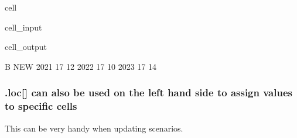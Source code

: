 \documentclass[letterpaper,10pt,english]{jupyterBook}
\begin{document}
\begin{sphinxuseclass}{cell}\begin{sphinxVerbatimInput}

\begin{sphinxuseclass}{cell_input}
\begin{sphinxVerbatim}[commandchars=\\\{\}]
\PYG{p}{[}\PYG{p}{[}\PYG{p}{]}\PYG{p}{]}
\end{sphinxVerbatim}

\end{sphinxuseclass}\end{sphinxVerbatimInput}
\begin{sphinxVerbatimOutput}

\begin{sphinxuseclass}{cell_output}
\begin{sphinxVerbatim}[commandchars=\\\{\}]
       B  NEW
2021  17   12
2022  17   10
2023  17   14
\end{sphinxVerbatim}

\end{sphinxuseclass}\end{sphinxVerbatimOutput}

\end{sphinxuseclass}

\subsubsection{.loc{[}{]} can also be used on the left hand side to assign values to specific cells}
\label{\detokenize{content/04_PythonEssentials/PythonPandasDataframes:loc-can-also-be-used-on-the-left-hand-side-to-assign-values-to-specific-cells}}
\sphinxAtStartPar
This can be very handy when updating scenarios.
\end{document}
